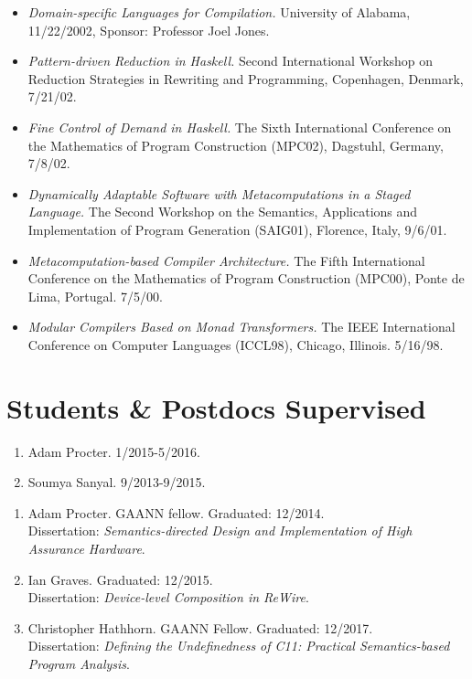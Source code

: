 \documentclass[11pt]{article}
\begin{document}
\begin{itemize}[leftmargin=0mm]
\item[]{\it Domain-specific Languages for Compilation.}
University of Alabama, 11/22/2002, Sponsor: Professor Joel Jones.

\item[]{\it Pattern-driven Reduction in Haskell.} Second International Workshop on Reduction Strategies in Rewriting and Programming, Copenhagen, Denmark, 7/21/02.

\item[]{\emph{Fine Control of Demand in Haskell.}} The Sixth International Conference on the Mathematics of Program Construction (MPC02), Dagstuhl, Germany, 7/8/02. 

\item[]{\it Dynamically Adaptable Software with Metacomputations in a Staged Language.} The Second Workshop on the Semantics, Applications and Implementation of Program Generation (SAIG01), Florence, Italy, 9/6/01. 

\item[]{\it Metacomputation-based Compiler Architecture.} The Fifth International Conference on the Mathematics of Program Construction (MPC00), Ponte de Lima, Portugal. 7/5/00. 

\item[]{\it Modular Compilers Based on Monad Transformers.} The IEEE International Conference on Computer Languages (ICCL98), Chicago, Illinois. 5/16/98.

\end{itemize}


\section{Students \& Postdocs Supervised}


\begin{enumerate}[leftmargin=0.0mm]
\item Adam Procter. 1/2015-5/2016.
\item Soumya Sanyal. 9/2013-9/2015.
\end{enumerate}


\begin{enumerate}[leftmargin=0.0mm]
\item Adam Procter. GAANN fellow. Graduated: 12/2014.\\
\newblock Dissertation: \emph{Semantics-directed Design and Implementation of High Assurance Hardware}.

\item Ian Graves. Graduated: 12/2015.\\
\newblock Dissertation: \emph{Device-level Composition in ReWire}.


\item Christopher Hathhorn. GAANN Fellow. Graduated: 12/2017.\\
\newblock Dissertation: \emph{Defining the Undefinedness of C11: Practical Semantics-based Program Analysis}.


\end{enumerate}
\end{document}
